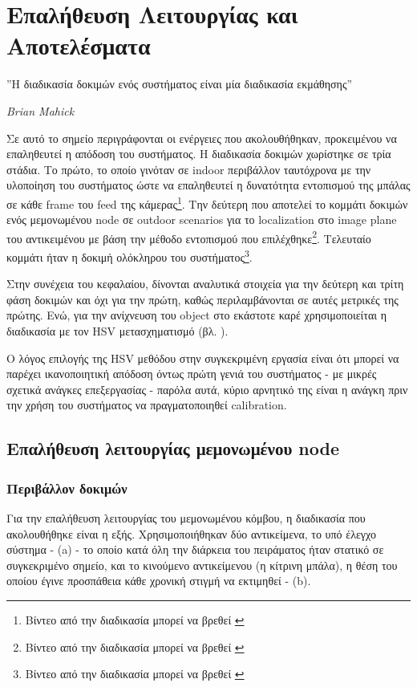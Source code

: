 \chapter{Επαλήθευση Λειτουργίας και Αποτελέσματα} %
\label{chap:Chapter6}

\epigraph{”Η διαδικασία δοκιμών ενός συστήματος είναι μία διαδικασία εκμάθησης''}{\textit{Brian Mahick}}

Σε αυτό το σημείο περιγράφονται οι ενέργειες που ακολουθήθηκαν, προκειμένου να επαληθευτεί η απόδοση του συστήματος.
Η διαδικασία δοκιμών χωρίστηκε σε τρία στάδια. Το πρώτο, το οποίο γινόταν σε indoor περιβάλλον ταυτόχρονα με την υλοποίηση του συστήματος
ώστε να επαληθευτεί η δυνατότητα εντοπισμού της μπάλας σε κάθε frame του feed της κάμερας\footnote{Βίντεο από την διαδικασία μπορεί να βρεθεί \cite{experiment-1-video}}. Την δεύτερη
που αποτελεί το κομμάτι δοκιμών ενός μεμονωμένου node σε outdoor scenarios για το localization στο image plane του αντικειμένου με βάση την μέθοδο εντοπισμού που επιλέχθηκε\footnote{
Βίντεο από την διαδικασία μπορεί να βρεθεί \cite{experiment-2-video}}. Τελευταίο κομμάτι ήταν η δοκιμή ολόκληρου του συστήματος\footnote{Βίντεο από την διαδικασία μπορεί να βρεθεί \cite{TODO}}.

Στην συνέχεια του κεφαλαίου, δίνονται αναλυτικά στοιχεία για την δεύτερη και τρίτη φάση δοκιμών και όχι για την πρώτη, καθώς περιλαμβάνονται σε αυτές μετρικές της πρώτης. Ενώ, για την ανίχνευση του object στο εκάστοτε καρέ χρησιμοποιείται η διαδικασία με τον HSV μετασχηματισμό (βλ. ).

Ο λόγος επιλογής της HSV μεθόδου στην συγκεκριμένη εργασία είναι ότι μπορεί να παρέχει ικανοποιητική απόδοση όντως πρώτη γενιά του συστήματος - με μικρές σχετικά ανάγκες επεξεργασίας - παρόλα αυτά, κύριο αρνητικό της είναι η ανάγκη πριν την χρήση του συστήματος να πραγματοποιηθεί calibration.

\section{Επαλήθευση λειτουργίας μεμονωμένου node}

\subsection{Περιβάλλον δοκιμών}
Για την επαλήθευση λειτουργίας του μεμονωμένου κόμβου, η διαδικασία που ακολουθήθηκε είναι η εξής. 
Χρησιμοποιήθηκαν δύο αντικείμενα, το υπό έλεγχο σύστημα -  (a) - το οποίο κατά όλη την διάρκεια του πειράματος ήταν στατικό σε συγκεκριμένο σημείο, και το κινούμενο αντικείμενου (η κίτρινη μπάλα), η θέση του οποίου έγινε προσπάθεια κάθε χρονική στιγμή να εκτιμηθεί -  (b).   

